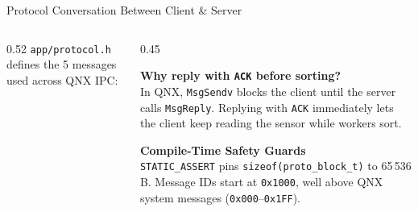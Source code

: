 \begin{frame}{Protocol Conversation Between Client \& Server}
  \begin{columns}[t, onlytextwidth]
    \begin{column}{0.52\textwidth}
      \texttt{app/protocol.h} defines the 5 messages used across QNX IPC:
      \vskip1mm
      \begin{center}
      \end{center}
    \end{column}
    \begin{column}{0.45\textwidth}
      \smalltext\compactitem
      \begin{highlight}
        \textbf{Why reply with \texttt{ACK} before sorting?} \\
        In QNX, \texttt{MsgSendv} blocks the client until the server calls \texttt{MsgReply}. Replying with \texttt{ACK} immediately lets the client keep reading the sensor while workers sort.
      \end{highlight}
      \vskip0.5mm
      \begin{tech}
        \textbf{Compile-Time Safety Guards} \\
        \texttt{STATIC\_ASSERT} pins \texttt{sizeof(proto\_block\_t)} to 65\,536 B. Message IDs start at \texttt{0x1000}, well above QNX system messages (\texttt{0x000}--\texttt{0x1FF}).
      \end{tech}
    \end{column}
  \end{columns}
\end{frame}

